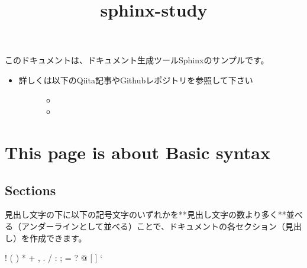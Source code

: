 \documentclass[letterpaper,10pt,dvipdfmx,openany,oneside]{sphinxmanual}
\title{sphinx-study}
\date{ }
\author{}
\begin{document}
\maketitle
\sphinxtableofcontents
{}\label{\detokenize{source/index::doc}}


このドキュメントは、ドキュメント生成ツールSphinxのサンプルです。
\begin{itemize}
\item {} \begin{description}
\item[{詳しくは以下のQiita記事やGithubレポジトリを参照して下さい}] \leavevmode\begin{itemize}
\item {} 

\item {} 

\end{itemize}

\end{description}

\end{itemize}


\chapter{This page is about Basic syntax}
\label{\detokenize{source/1.chapter/basic_syntax:this-page-is-about-basic-syntax}}\label{\detokenize{source/1.chapter/basic_syntax::doc}}\label{\detokenize{source/1.chapter/basic_syntax:sphinx-sample-project}}

\section{Sections}
\label{\detokenize{source/1.chapter/basic_syntax:sections}}
見出し文字の下に以下の記号文字のいずれかを**見出し文字の数より多く**並べる（アンダーラインとして並べる）ことで、ドキュメントの各セクション（見出し）を作成できます。

%
\begin{sphinxVerbatim}[commandchars=\\\{\}]
! \PYGZdq{} \PYGZsh{} \PYGZdl{} \PYGZpc{} \PYGZam{} \PYGZsq{} ( ) * + , \PYGZhy{} . / : ; \PYGZlt{} = \PYGZgt{} ? @ [ \PYGZbs{} ] \PYGZca{} \PYGZus{} {}` \PYGZob{} \textbar{} \PYGZcb{} \PYGZti{}
\end{sphinxVerbatim}
\end{document}
